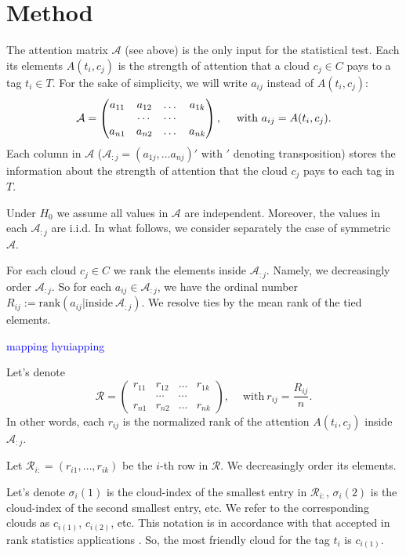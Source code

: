 \documentclass{llncs}
\begin{document}
%
\section{Method}
The attention matrix $\mathcal{A}$ (see above) is the only input for the statistical test. Each its elements $A(t_i, c_j)$ is the strength of attention that a cloud $c_j \in C$
 pays to a tag $t_i \in T$. For the sake of simplicity, we will write $a_{ij}$ instead of $A(t_i, c_j)$:
\[
\mathcal{A} = \begin{pmatrix}
a_{11} & a_{12} & \dots & a_{1k} \\
       &\cdots & \cdots &  \\
a_{n1} & a_{n2} & \dots & a_{nk}
\end{pmatrix}, 
\quad ~\text{with}~a_{ij} = A(t_i, c_j).
\]
Each column in $\mathcal{A}$ ($\mathcal{A}_{:j} =(a_{1j}, \dots a_{nj})'$ with $'$ denoting transposition)  stores the information about the strength of attention that the cloud $c_j$ pays to each tag in $T$. 

Under $H_0$ we assume all values in $\mathcal{A}$ are independent. Moreover, the values in each
$\mathcal{A}_{:j}$ are i.i.d.
In what follows, we consider separately the case of symmetric $\mathcal{A}$.

For each cloud $c_j \in C$ we rank the elements inside
$\mathcal{A}_{:j}$.
Namely, we decreasingly order $\mathcal{A}_{:j}$. So for each $a_{ij} \in \mathcal{A}_{:j}$, we have the ordinal number $R_{ij}:=\text{rank}\left(a_{ij}|\text{inside}~\mathcal{A}_{:j}\right)$. We resolve ties by the mean rank of the tied elements. 


\textcolor{blue}{mapping hyuiapping}


Let's denote
\[
\mathcal{R} = \begin{pmatrix}
r_{11} & r_{12} & \dots & r_{1k} \\
       &\cdots & \cdots &  \\
r_{n1} & r_{n2} & \dots & r_{nk}
\end{pmatrix}, 
\quad ~\text{with}~r_{ij} = \frac{R_{ij}}{n}.
\]
In other words, each $r_{ij}$ is the normalized rank of the attention $A(t_i, c_j)$ inside $\mathcal{A}_{:j}$. 

Let $\mathcal{R}_{i:} = (r_{i1}, \dots, r_{ik})$ be the $i$-th row in $\mathcal{R}$. We decreasingly order its elements.

Let's denote $\sigma_i(1)$ is the cloud-index of the smallest entry in $\mathcal{R}_{i:}$, ${\sigma_i(2)}$ is the cloud-index of the second smallest entry, etc. We refer to the corresponding clouds as $c_{i(1)}$, $c_{i(2)}$, etc. This notation is in accordance with that accepted in rank statistics applications \cite{Gut:2009}. 
So, the most friendly cloud for the tag $t_i$ is $c_{i(1)}$.
 
\end{document}
